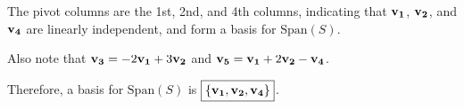 \begin{solution}
    The pivot columns are the 1st, 2nd, and 4th columns, indicating that $\bm{\mathrm{v_1}}$,
    $\bm{\mathrm{v_2}}$, and $\bm{\mathrm{v_4}}$ are linearly independent, and form a basis for
    $\text{Span}(S)$.

    Also note that $\bm{\mathrm{v_3}} = -2\bm{\mathrm{v_1}} + 3\bm{\mathrm{v_2}}$ and
    $\bm{\mathrm{v_5}} = \bm{\mathrm{v_1}} + 2\bm{\mathrm{v_2}} - \bm{\mathrm{v_4}}$.

    Therefore, a basis for $\text{Span}(S)$ is $\boxed{\{\bm{\mathrm{v_1}}, \bm{\mathrm{v_2}}, \bm{\mathrm{v_4}}\}}$.
\end{solution}